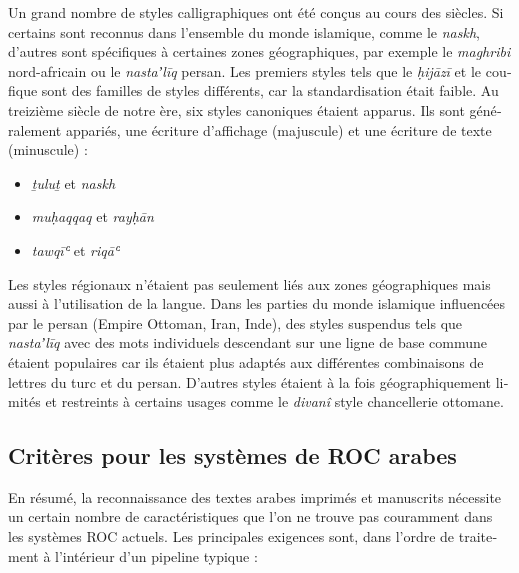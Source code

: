 \begin{french}
Un grand nombre de styles calligraphiques ont été conçus au cours des siècles.
Si certains sont reconnus dans l'ensemble du monde islamique, comme le
\emph{naskh}, d'autres sont spécifiques à certaines zones géographiques, par
exemple le \emph{maghribi} nord-africain ou le \emph{nastaʼlīq} persan. Les
premiers styles tels que le \emph{ḥijāzī} et le coufique sont des familles de
styles différents, car la standardisation était faible. Au treizième siècle de
notre ère, six styles canoniques étaient apparus. Ils sont généralement
appariés, une écriture d'affichage (majuscule) et une écriture de texte
(minuscule) :

\begin{itemize}
        \item \emph{ṯuluṯ} et \emph{naskh}
        \item \emph{muḥaqqaq} et \emph{rayḥān}
        \item \emph{tawqīʿ} et \emph{riqāʿ}
\end{itemize}

Les styles régionaux n'étaient pas seulement liés aux zones géographiques mais
aussi à l'utilisation de la langue.  Dans les parties du monde islamique
influencées par le persan (Empire Ottoman, Iran, Inde), des styles suspendus
tels que \emph{nastaʼlīq} avec des mots individuels descendant sur une ligne de
base commune étaient populaires car ils étaient plus adaptés aux différentes
combinaisons de lettres du turc et du persan. D'autres styles étaient à la fois
géographiquement limités et restreints à certains usages comme le
\emph{divanî} style chancellerie ottomane.

\subsection{Critères pour les systèmes de ROC arabes}

En résumé, la reconnaissance des textes arabes imprimés et manuscrits nécessite
un certain nombre de caractéristiques que l'on ne trouve pas couramment dans
les systèmes ROC actuels. Les principales exigences sont, dans l'ordre de
traitement à l'intérieur d'un pipeline typique :


\end{french}

